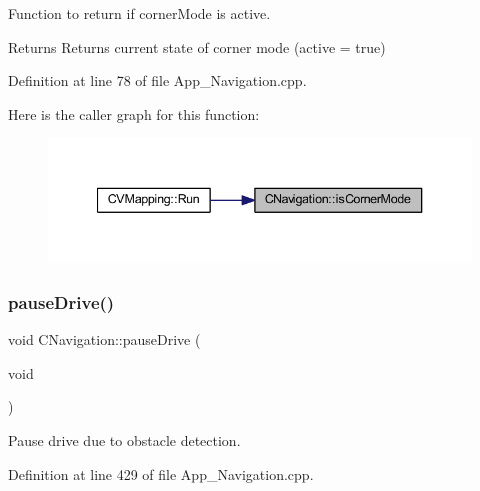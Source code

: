 Function to return if corner\+Mode is active. 

\begin{DoxyReturn}{Returns}
Returns current state of corner mode (active = true) 
\end{DoxyReturn}


Definition at line 78 of file App\+\_\+\+Navigation.\+cpp.

Here is the caller graph for this function\+:
\nopagebreak
\begin{figure}[H]
\begin{center}
\leavevmode
\includegraphics[width=340pt]{class_c_navigation_aa984fc062deefed13a85d866d997de73_icgraph}
\end{center}
\end{figure}
\mbox{\label{class_c_navigation_a27649dc6324360829d42aea67e88e3ee}} 
\subsubsection{\texorpdfstring{pauseDrive()}{pauseDrive()}}
{\footnotesize\ttfamily void C\+Navigation\+::pause\+Drive (\begin{DoxyParamCaption}\item[{void}]{ }\end{DoxyParamCaption})\hspace{0.3cm}{\ttfamily [virtual]}}



Pause drive due to obstacle detection. 



Definition at line 429 of file App\+\_\+\+Navigation.\+cpp.

